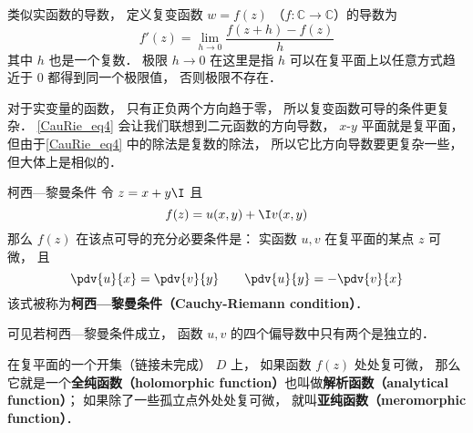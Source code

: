
\begin{issues}
\issueTODO
\end{issues}


\begin{definition}{}
类似实函数的导数， 定义复变函数 $w = f(z)$ （$f:\mathbb C\to \mathbb C$）的导数为
\begin{equation}\label{CauRie_eq4}
f'(z) = \lim_{h\to 0} \frac{f(z + h) - f(z)}{h}
\end{equation}
其中 $h$ 也是一个复数． 极限 $h \to 0$ 在这里是指 $h$ 可以在复平面上以任意方式趋近于 $0$ 都得到同一个极限值， 否则极限不存在．
\end{definition}

对于实变量的函数， 只有正负两个方向趋于零， 所以复变函数可导的条件更复杂． \autoref{CauRie_eq4} 会让我们联想到二元函数的方向导数， $x$-$y$ 平面就是复平面， 但由于\autoref{CauRie_eq4} 中的除法是复数的除法， 所以它比方向导数要更复杂一些， 但大体上是相似的．

\begin{theorem}{柯西—黎曼条件}
令 $z = x + y\I$ 且
\begin{equation}
f(z) = u(x, y) + \I v(x, y)
\end{equation}
那么 $f(z)$ 在该点可导的充分必要条件是： 实函数 $u,v$ 在复平面的某点 $z$ 可微， 且
\begin{equation}\label{CauRie_eq1}
\pdv{u}{x} = \pdv{v}{y} \qquad
\pdv{u}{y} = - \pdv{v}{x}
\end{equation}
该式被称为\textbf{柯西—黎曼条件（Cauchy-Riemann condition）}．
\end{theorem}
可见若柯西—黎曼条件成立， 函数 $u,v$ 的四个偏导数中只有两个是独立的．

在复平面的一个开集（链接未完成） $D$ 上， 如果函数 $f(z)$ 处处复可微， 那么它就是一个\textbf{全纯函数（holomorphic function）}也叫做\textbf{解析函数（analytical function）}； 如果除了一些孤立点外处处复可微， 就叫\textbf{亚纯函数（meromorphic function）}．


